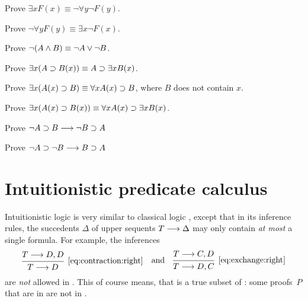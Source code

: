 \documentclass[11pt,a4paper]{article}
\begin{document}
\begin{exercise}[Exercise 2.5.3]\label{exe:2.5.3}
    Prove \(\exists x F(x) \equiv\lnot\forall y\lnot F(y)\).
\end{exercise}
\begin{exercise}[Exercise 2.5.4]\label{exe:2.5.4}
    Prove \(\lnot\forall yF(y) \equiv\exists x\lnot F(x)\).
\end{exercise}
\begin{exercise}[Exercise 2.5.5]\label{exe:2.5.5}
    Prove \(\lnot(A\land B) \equiv \lnot A\lor\lnot B\).
\end{exercise}
\begin{exercise}[Exercise 2.6.1]\label{exe:2.6.1}
    Prove \(\exists x(A\supset B(x))\equiv A\supset\exists xB(x)\).
\end{exercise}
\begin{exercise}[Exercise 2.6.2]\label{exe:2.6.2}
    Prove \(\exists x(A(x)\supset B)\equiv\forall xA(x)\supset B\),
    where \(B\) does not contain \(x\).
\end{exercise}
\begin{exercise}[Exercise 2.6.3]\label{exe:2.6.3}
    Prove \(\exists x(A(x)\supset B(x))\equiv\forall xA(x)\supset\exists xB(x)\).
\end{exercise}
\begin{exercise}[Exercise 2.6.4]\label{exe:2.6.4}
    Prove \(\lnot A\supset B\longrightarrow\lnot B\supset A\)
\end{exercise}
\begin{exercise}[Exercise 2.6.5]\label{exe:2.6.5}
    Prove \(\lnot A\supset\lnot B\longrightarrow B\supset A\)
\end{exercise}


\section{Intuitionistic predicate calculus \LJ}

Intuitionistic logic \LJ{} is very similar to classical logic \LK,
except that in its inference rules, the succedents \(\Delta\) of upper sequents \(T\longrightarrow\Delta\)
may only contain \emph{at most} a single formula. For example, the inferences
\begin{equation*}
    \begin{prooftree}
        \hypo{T\seq D, D}
        \infer1[\eqref{eq:contraction:right}]{T\seq D}
    \end{prooftree}
    \quad\text{and}\quad
    \begin{prooftree}
        \hypo{T\seq C, D}
        \infer1[\eqref{eq:exchange:right}]{T\seq D, C}
    \end{prooftree}
\end{equation*}
are \emph{not} allowed in \LJ{}. This of course means, that \LJ{} is a true subset of \LK:
some proofs~\(P\) that are in \LK{} are not in \LJ{}.
\end{document}
